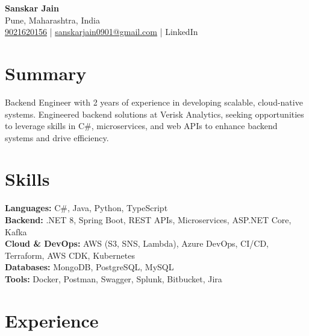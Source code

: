 \documentclass[a4paper,10pt]{article}
\begin{document}
\begin{center}
    {\LARGE \textbf{Sanskar Jain}} \\
    Pune, Maharashtra, India \\
    \href{tel:9021620156}{9021620156} \;|\;
    \href{mailto:sanskarjain0901@gmail.com}{sanskarjain0901@gmail.com} \;|\;
    LinkedIn
\end{center}

\vspace{5pt}

\section*{Summary}
Backend Engineer with 2 years of experience in developing scalable, cloud-native systems. Engineered backend solutions at Verisk Analytics, seeking opportunities to leverage skills in C\#, microservices, and web APIs to enhance backend systems and drive efficiency.

\section*{Skills}
\textbf{Languages:} C\#, Java, Python, TypeScript \\
\textbf{Backend:} .NET 8, Spring Boot, REST APIs, Microservices, ASP.NET Core, Kafka \\
\textbf{Cloud \& DevOps:} AWS (S3, SNS, Lambda), Azure DevOps, CI/CD, Terraform, AWS CDK, Kubernetes \\
\textbf{Databases:} MongoDB, PostgreSQL, MySQL \\
\textbf{Tools:} Docker, Postman, Swagger, Splunk, Bitbucket, Jira

\section*{Experience}
\end{document}
